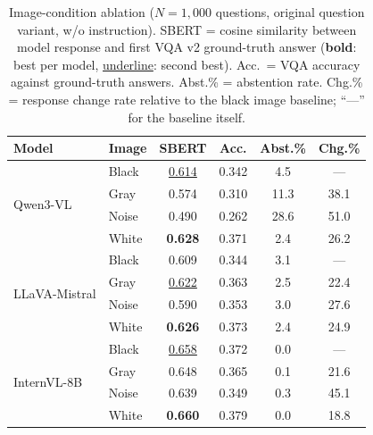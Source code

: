 \begin{table}[t]
\centering
\small
\setlength{\tabcolsep}{4pt}
\begin{tabular}{ll cccc}
\toprule
\textbf{Model} & \textbf{Image} & SBERT & Acc. & Abst.\% & Chg.\% \\
\midrule
\multirow{4}{*}{Qwen3-VL}
 & Black & \underline{0.614} & 0.342 & 4.5 & --- \\
 & Gray  & 0.574 & 0.310 & 11.3 & 38.1 \\
 & Noise & 0.490 & 0.262 & 28.6 & 51.0 \\
 & White & \textbf{0.628} & 0.371 & 2.4 & 26.2 \\
\midrule
\multirow{4}{*}{LLaVA-Mistral}
 & Black & 0.609 & 0.344 & 3.1 & --- \\
 & Gray  & \underline{0.622} & 0.363 & 2.5 & 22.4 \\
 & Noise & 0.590 & 0.353 & 3.0 & 27.6 \\
 & White & \textbf{0.626} & 0.373 & 2.4 & 24.9 \\
\midrule
\multirow{4}{*}{InternVL-8B}
 & Black & \underline{0.658} & 0.372 & 0.0 & --- \\
 & Gray  & 0.648 & 0.365 & 0.1 & 21.6 \\
 & Noise & 0.639 & 0.349 & 0.3 & 45.1 \\
 & White & \textbf{0.660} & 0.379 & 0.0 & 18.8 \\
\midrule
\end{tabular}
\caption{Image-condition ablation ($N{=}1{,}000$ questions, original question variant, w/o instruction). SBERT = cosine similarity between model response and first VQA v2 ground-truth answer (\textbf{bold}: best per model, \underline{underline}: second best). Acc.\ = VQA accuracy against ground-truth answers. Abst.\% = abstention rate. Chg.\% = response change rate relative to the black image baseline; ``---'' for the baseline itself.}
\label{tab:image_ablation_main}
\end{table}
